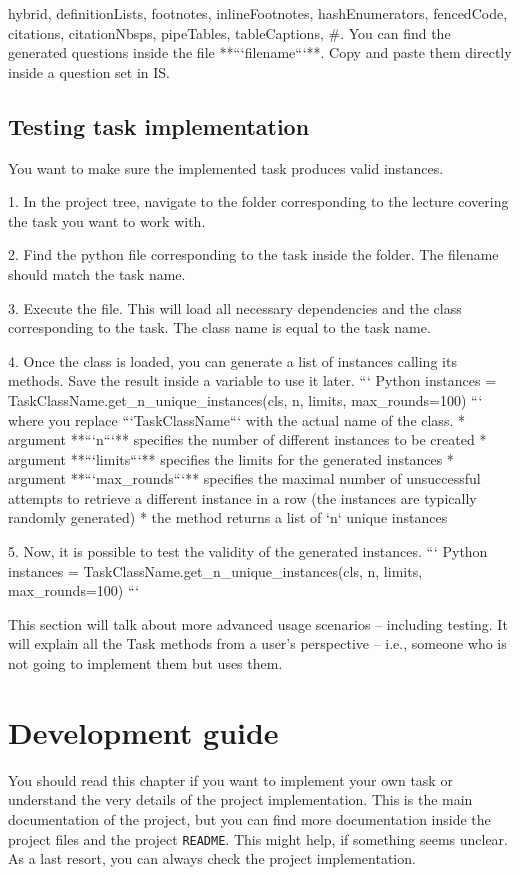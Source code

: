 \documentclass[
  digital, %
  table,   %
  twoside, %
  nolof,     %
  nolot,     %
  draft=false,
  final,
]{fithesis3}
\begin{document}
\begin{markdown*}{%
  hybrid,
  definitionLists,
  footnotes,
  inlineFootnotes,
  hashEnumerators,
  fencedCode,
  citations,
  citationNbsps,
  pipeTables,
  tableCaptions,
}
#. You can find the generated questions inside the file **```filename```**. Copy and paste them directly inside a question set in IS.

\section{Testing task implementation}

You want to make sure the implemented task produces valid instances. 

1. In the project tree, navigate to the folder corresponding to the lecture covering the task you want to work with.
    
2. Find the python file corresponding to the task inside the folder. The filename should match the task name.
    
3. Execute the file. This will load all necessary dependencies and the class corresponding to the task. The class name is equal to the task name. 
    
4. Once the class is loaded, you can generate a list of instances calling its methods. Save the result inside a variable to use it later.
``` Python
    instances = TaskClassName.get_n_unique_instances(cls, n, limits, max_rounds=100)
```
where you replace ```TaskClassName``` with the actual name of the class. 
    * argument **```n```** specifies the number of different instances to be created
    * argument **```limits```** specifies the limits for the generated instances
    * argument **```max_rounds```** specifies the maximal number of unsuccessful attempts to retrieve a different instance in a row (the instances are typically randomly generated)
    * the method returns a list of `n` unique instances

5. Now, it is possible to test the validity of the generated instances. 
``` Python
    instances = TaskClassName.get_n_unique_instances(cls, n, limits, max_rounds=100)
```

This section will talk about more advanced usage scenarios -- including testing. It will explain all the Task methods from a user's perspective -- i.e., someone who is not going to implement them but uses them.

\chapter{Development guide}

You should read this chapter if you want to implement your own task or understand the very details of the project implementation. This is the main documentation of the project, but you can find more documentation inside the project files and the project \verb|README|. This might help, if something seems unclear. As a last resort, you can always check the project implementation.


\end{markdown*}
\end{document}
